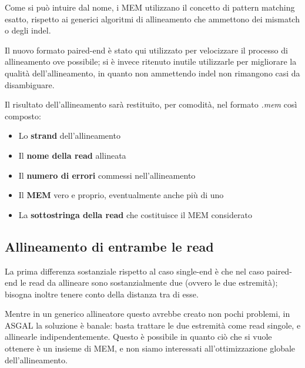 Come si può intuire dal nome, i MEM utilizzano il concetto di pattern matching esatto, rispetto  ai generici algoritmi di allineamento che ammettono dei mismatch o degli indel. 

Il nuovo formato paired-end è stato qui utilizzato per velocizzare il processo di allineamento ove possibile; si è invece ritenuto inutile utilizzarle per migliorare la qualità dell'allineamento, in quanto non ammettendo indel non rimangono casi da disambiguare.

\newpage

Il risultato dell'allineamento sarà restituito, per comodità, nel formato \textit{.mem} così composto:

\begin{itemize}
	\item Lo \textbf{strand} dell'allineamento
	\item	Il \textbf{nome della read} allineata
	\item Il \textbf{numero di errori} commessi nell'allineamento 
	\item Il \textbf{MEM} vero e proprio, eventualmente anche più di uno
	\item La \textbf{sottostringa della read} che costituisce il MEM considerato
\end{itemize}

\subsection{Allineamento di entrambe le read}
La prima differenza sostanziale rispetto al caso single-end è che nel caso paired-end le read da allineare sono sostanzialmente due (ovvero le due estremità); bisogna inoltre tenere conto della distanza tra di esse. 

Mentre in un generico allineatore questo avrebbe creato non pochi problemi, in ASGAL la soluzione è banale: basta trattare le due estremità come read singole, e allinearle indipendentemente. Questo è possibile in quanto ciò che si vuole ottenere è un insieme di MEM, e non siamo interessati all'ottimizzazione globale dell'allineamento. %

